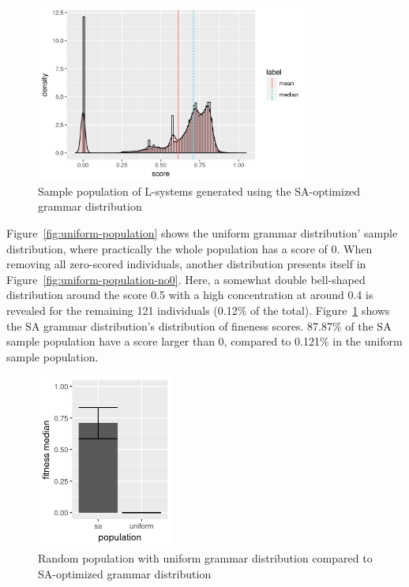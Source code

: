 \begin{figure}
    \centering
    \includegraphics[width=0.8\textwidth]{figures/sa-population}
    \caption{Sample population of L-systems generated using the SA-optimized grammar distribution}
    \label{fig:sa-population}
\end{figure}

Figure~\ref{fig:uniform-population} shows the uniform grammar distribution' sample distribution, where practically the whole population has a score of 0.
When removing all zero-scored individuals, another distribution presents itself in Figure~\ref{fig:uniform-population-no0}.
Here, a somewhat double bell-shaped distribution around the score 0.5 with a high concentration at around 0.4 is revealed for the remaining 121 individuals (0.12\% of the total).
Figure~\ref{fig:sa-population} shows the SA grammar distribution's distribution of fineness scores.
87.87\% of the SA sample population have a score larger than 0, compared to 0.121\% in the uniform sample population.

\begin{figure}
    \centering
    \includegraphics[width=0.4\textwidth]{figures/sa-uniform}
    \caption{Random population with uniform grammar distribution compared to SA-optimized grammar distribution}
    \label{fig:sa-uniform}
\end{figure}

